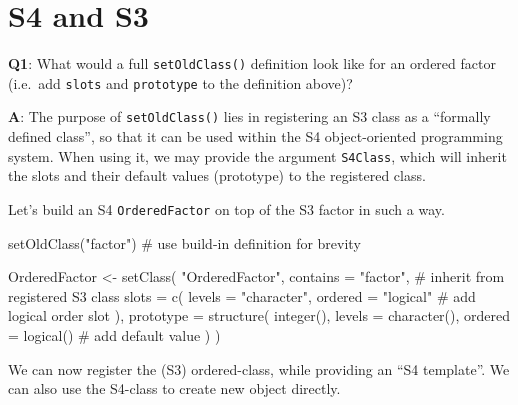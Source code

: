 \documentclass[
]{krantz}
\makeatletter
\newenvironment{Shaded}{\begin{snugshade}}{\end{snugshade}}
\newcommand{\CommentTok}[1]{\textcolor[rgb]{0.56,0.35,0.01}{\textit{#1}}}
\newcommand{\DataTypeTok}[1]{\textcolor[rgb]{0.13,0.29,0.53}{#1}}
\newcommand{\KeywordTok}[1]{\textcolor[rgb]{0.13,0.29,0.53}{\textbf{#1}}}
\newcommand{\NormalTok}[1]{#1}
\newcommand{\StringTok}[1]{\textcolor[rgb]{0.31,0.60,0.02}{#1}}
\newenvironment{kframe}{%
\medskip{}
\setlength{\fboxsep}{.8em}
 \def\at@end@of@kframe{}%
 \ifinner\ifhmode%
  \def\at@end@of@kframe{\end{minipage}}%
  \begin{minipage}{\columnwidth}%
 \fi\fi%
 \def\FrameCommand##1{\hskip\@totalleftmargin \hskip-\fboxsep
 \colorbox{shadecolor}{##1}\hskip-\fboxsep
     \hskip-\linewidth \hskip-\@totalleftmargin \hskip\columnwidth}%
 \MakeFramed {\advance\hsize-\width
   \@totalleftmargin\z@ \linewidth\hsize
   \@setminipage}}%
 {\par\unskip\endMakeFramed%
 \at@end@of@kframe}
\renewenvironment{Shaded}{\begin{kframe}}{\end{kframe}}
\renewcommand{\KeywordTok} [1]{\textcolor[rgb]{0.00,0.44,0.13}{{#1}}}
\renewcommand{\DataTypeTok}[1]{\textcolor[rgb]{0.56,0.13,0.00}{{#1}}}
\renewcommand{\StringTok}  [1]{\textcolor[rgb]{0.25,0.44,0.63}{{#1}}}
\renewcommand{\CommentTok} [1]{\textcolor[rgb]{0.38,0.63,0.69}{{#1}}}
\renewcommand{\NormalTok}  [1]{{#1}}
\makeatother
\begin{document}
\hypertarget{s4-and-s3}{%
\section{S4 and S3}\label{s4-and-s3}}

\textbf{{Q1}}: What would a full \texttt{setOldClass()} definition look like for an ordered factor (i.e.~add \texttt{slots} and \texttt{prototype} to the definition above)?

\textbf{{A}}: The purpose of \texttt{setOldClass()} lies in registering an S3 class as a ``formally defined class'', so that it can be used within the S4 object-oriented programming system. When using it, we may provide the argument \texttt{S4Class}, which will inherit the slots and their default values (prototype) to the registered class.

Let's build an S4 \texttt{OrderedFactor} on top of the S3 factor in such a way.

\begin{Shaded}
\begin{Highlighting}[]
\KeywordTok{setOldClass}\NormalTok{(}\StringTok{"factor"}\NormalTok{)    }\CommentTok{# use build-in definition for brevity}

\NormalTok{OrderedFactor <-}\StringTok{ }\KeywordTok{setClass}\NormalTok{(}
  \StringTok{"OrderedFactor"}\NormalTok{,}
  \DataTypeTok{contains =} \StringTok{"factor"}\NormalTok{,   }\CommentTok{# inherit from registered S3 class}
  \DataTypeTok{slots =} \KeywordTok{c}\NormalTok{(}
    \DataTypeTok{levels =} \StringTok{"character"}\NormalTok{,}
    \DataTypeTok{ordered =} \StringTok{"logical"}  \CommentTok{# add logical order slot}
\NormalTok{  ),}
  \DataTypeTok{prototype =} \KeywordTok{structure}\NormalTok{(}
    \KeywordTok{integer}\NormalTok{(),}
    \DataTypeTok{levels =} \KeywordTok{character}\NormalTok{(),}
    \DataTypeTok{ordered =} \KeywordTok{logical}\NormalTok{()  }\CommentTok{# add default value}
\NormalTok{  )}
\NormalTok{)}
\end{Highlighting}
\end{Shaded}

We can now register the (S3) ordered-class, while providing an ``S4 template''. We can also use the S4-class to create new object directly.
\end{document}
